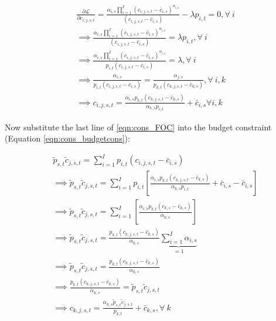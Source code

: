       \begin{equation} \label{eqn:cons_FOC}
      \begin{split}
       & \frac{\partial \mathcal{L}}{\partial c_{i,j,s,t}} = \frac{\alpha_{i,s} \prod_{i=1}^I \left( c_{i,j,s,t} - \bar c_{i,s} \right) ^{\alpha_{i,s}}}{(c_{i,j,s,t}-\bar{c}_{i,s})}-\lambda p_{i,t} = 0, \forall \ i  \\
       & \implies  \frac{\alpha_{i,s} \prod_{i=1}^I \left( c_{i,j,s,t} - \bar c_{i,s} \right) ^{\alpha_{i,s}}}{(c_{i,j,s,t}-\bar{c}_{i,s})} = \lambda p_{i,t}, \forall \ i \\
       & \implies  \frac{\alpha_{i,s} \prod_{i=1}^I \left( c_{i,j,s,t} - \bar c_{i,s} \right) ^{\alpha_{i,s}}}{ p_{i,t}(c_{i,j,s,t}-\bar{c}_{i,s})} = \lambda, \forall \ i \\
       & \implies \frac{\alpha_{i,s}}{p_{i,t}(c_{i,j,s,t}-\bar{c}_{i,s})}=\frac{\alpha_{j,s}}{p_{k,t}(c_{k,j,s,t}-\bar{c}_{k,s})}, \forall \ i,k \\
       & \implies c_{i,j,s,t}= \frac{\alpha_{i,s} p_{k,t}(c_{k,j,s,t}-\bar{c}_{k,s})}{\alpha_{k,s} p_{i,t}} + \bar{c}_{i,s} \forall i,k 
       \end{split}
    \end{equation}
    
    Now substitute the last line of \ref{eqn:cons_FOC} into the budget constraint (Equation \ref{eqn:cons_budgetcons}):
    
          \begin{equation} \label{eqn:cons_solve}
      \begin{split}
       & \tilde{p}_{s,t}\tilde{c}_{j,s,t} = \sum_{i=1}^{I}p_{i,t}(c_{i,j,s,t}-\bar{c}_{i,s}) \\
       & \implies  \tilde{p}_{s,t}\tilde{c}_{j,s,t} = \sum_{i=1}^{I}p_{i,t}\left[ \frac{\alpha_{i,s} p_{k,t}(c_{k,j,s,t}-\bar{c}_{k,s})}{\alpha_{k,s} p_{i,t}} + \bar{c}_{i,s}- \bar{c}_{i,s}\right] \\
       & \implies  \tilde{p}_{s,t}\tilde{c}_{j,s,t} = \sum_{i=1}^{I}\left[ \frac{\alpha_{i,s} p_{k,t}(c_{k,s}-\bar{c}_{k,s})}{\alpha_{k,s}}\right] \\
       & \implies  \tilde{p}_{s,t}\tilde{c}_{j,s,t} = \frac{ p_{k,t}(c_{k,j,s,t}-\bar{c}_{k,s})}{\alpha_{k,s}} \underbrace{\sum_{i=1}^{I}\alpha_{i,s}}_{=1} \\	
        & \implies  \tilde{p}_{s,t}\tilde{c}_{j,s,t} = \frac{ p_{k,t}(c_{k,j,s,t}-\bar{c}_{k,s})}{\alpha_{k,s}} \\
        & \implies  \frac{ p_{k,t}(c_{k,j,s,t}-\bar{c}_{k,s})}{\alpha_{k,s}}  = \tilde{p}_{s,t}\tilde{c}_{j,s,t}   \\	
        & \implies  c_{k,j,s,t}  = \frac{\alpha_{k,s} \tilde{p}_{s,t}\tilde{c}_{j,s,t}}{p_{k,t}} + \bar{c}_{k,s},  \forall \ k  \\	
       \end{split}
    \end{equation}
    
